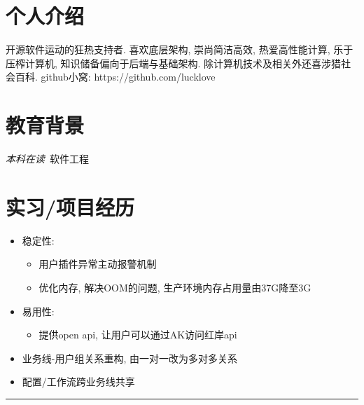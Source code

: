 \documentclass[UTF8]{resume}
\newcommand{\subsectionrule}{{\vspace{-8pt}\hspace{0.5cm}\rule[1pt]{\linewidth-1cm}{0.05pt}\vspace{-8pt}}}
\begin{document}


\section{\faUser 个人介绍}
开源软件运动的狂热支持者.
\newline
喜欢底层架构, 崇尚简洁高效, 热爱高性能计算, 乐于压榨计算机, 知识储备偏向于后端与基础架构.
\newline
除计算机技术及相关外还喜涉猎社会百科.
\newline
github小窝: https://github.com/lucklove

\section{\faGraduationCap 教育背景}
\textit{本科在读}\ 软件工程

\section{\faStar 实习/项目经历}
\begin{itemize}
  \item 稳定性:
  \begin{itemize}
    \item 用户插件异常主动报警机制
    \item 优化内存, 解决OOM的问题, 生产环境内存占用量由37G降至3G
  \end{itemize}
  \item 易用性:
  \begin{itemize}
    \item 提供open api, 让用户可以通过AK访问红岸api
  \end{itemize}
\end{itemize}
\begin{itemize}
  \item 业务线-用户组关系重构, 由一对一改为多对多关系
  \item 配置/工作流跨业务线共享
\end{itemize}

\subsectionrule
\end{document}

